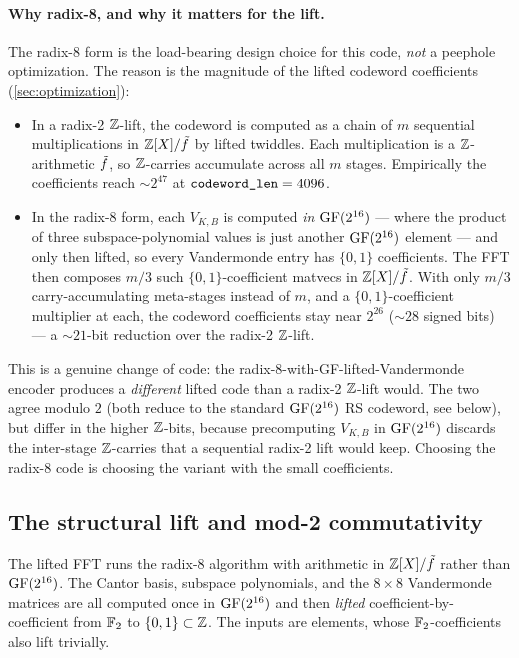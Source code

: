 \paragraph{Why radix-8, and why it matters for the lift.}
The radix-8 form is the load-bearing design choice for this code,
\emph{not} a peephole optimization. The reason is the magnitude of the
lifted codeword coefficients (\autoref{sec:optimization}):

\begin{itemize}
  \item In a radix-2 $\mathbb{Z}$-lift, the codeword is computed as a chain of
    $m$ sequential multiplications in $\mathbb{Z}[X]/\tilde f$ by lifted twiddles. Each
    multiplication is a $\mathbb{Z}$-arithmetic $\tilde f$,
    so $\mathbb{Z}$-carries accumulate across all $m$ stages. Empirically the
    coefficients reach $\sim 2^{47}$ at $\texttt{codeword\_len} = 4096$.
  \item In the radix-8 form, each $V_{K,B}$ is computed \emph{in
    $\operatorname{GF}(2^{16})$} --- where the product of three subspace-polynomial
    values is just another $\operatorname{GF}(2^{16})$ element --- and only then
    lifted, so every Vandermonde entry has $\{0,1\}$ coefficients. The
    FFT then composes $m/3$ such $\{0,1\}$-coefficient matvecs in
    $\mathbb{Z}[X]/\tilde f$. With only $m/3$ carry-accumulating meta-stages instead of
    $m$, and a $\{0,1\}$-coefficient multiplier at each, the codeword
    coefficients stay near $2^{26}$ ($\sim 28$ signed bits) --- a
    $\sim 21$-bit reduction over the radix-2 $\mathbb{Z}$-lift.
\end{itemize}

This is a genuine change of code: the radix-8-with-GF-lifted-Vandermonde
encoder produces a \emph{different} lifted code than a radix-2 $\mathbb{Z}$-lift
would. The two agree modulo $2$ (both reduce to the standard
$\operatorname{GF}(2^{16})$ RS codeword, see below), but differ in the higher
$\mathbb{Z}$-bits, because precomputing $V_{K,B}$ in $\operatorname{GF}(2^{16})$ discards the
inter-stage $\mathbb{Z}$-carries that a sequential radix-2 lift would keep.
Choosing the radix-8 code is choosing the variant with the small
coefficients.

\subsection{The structural lift and mod-2 commutativity}
\label{sec:lift}

The lifted FFT runs the radix-8 algorithm with arithmetic in $\mathbb{Z}[X]/\tilde f$
rather than $\operatorname{GF}(2^{16})$. The Cantor basis, subspace polynomials, and
the $8 \times 8$ Vandermonde matrices are all computed once in
$\operatorname{GF}(2^{16})$ and then \emph{lifted} coefficient-by-coefficient from
$\mathbb{F}_2$ to $\{0, 1\} \subset \mathbb{Z}$. The inputs are 
elements, whose $\mathbb{F}_2$-coefficients also lift trivially.

